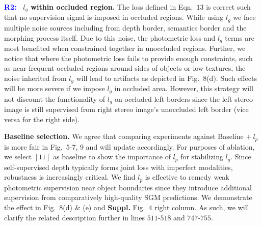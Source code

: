 \documentclass[10pt,twocolumn,letterpaper]{article}
\newcommand{\Paragraph}[1]{\vspace{0.40mm} \noindent \textbf{#1} \hspace{0mm}}
\begin{document}

\Paragraph{\textcolor{blue}{R2:~}}
\textbf{$l_g$ within occluded region.}
The loss defined in Eqn.~$13$ is correct such that no supervision signal is imposed in occluded regions. 
While using $l_g$ we face multiple noise sources including from depth border, semantics border and the morphing process itself. %
Due to this noise, the photometric loss and $l_g$ terms are most benefited when constrained together in unoccluded regions. 
Further, we notice that where the photometric loss fails to provide enough constraints, such as near frequent occluded regions around sides of objects or low-textures, the noise inherited from $l_g$ will lead to artifacts as depicted in Fig.~$8$(d).
Such effects will be more severe if we impose $l_g$ in occluded area.
However, this strategy will not discount the functionality of $l_g$ on occluded left borders since the left stereo image is still supervised from right stereo image's unoccluded left border (vice versa for the right side). 

\Paragraph{Baseline selection.} 
We agree that comparing experiments against Baseline $ +~{l_p}$ is more fair in Fig.~$5\text{-}7$, $9$ and will update accordingly. 
For purposes of ablation, we select $[11]$ as baseline to show the importance of $l_p$ for stabilizing $l_g$. 
Since self-supervised depth typically forms joint loss with imperfect modalities, robustness is increasingly critical. %
We find ${l_p}$ is effective to remedy weak photometric supervision near object boundaries since they introduce additional supervision from comparatively high-quality SGM predictions. 
We demonstrate the effect in Fig.~$8$(d) \& (e) and \textbf{Suppl.} Fig.~$4$ right column. 
As such, we will clarify the related description further in lines $511\text{-}518$ and $747\text{-}755$.
\end{document}
